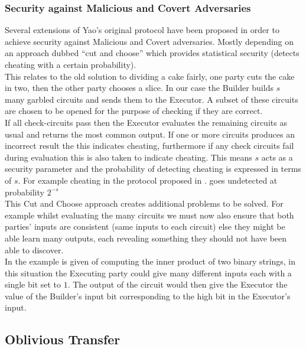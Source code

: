 \documentclass[a4paper,11pt]{article}
\begin{document}
			\subsubsection{Security against Malicious and Covert Adversaries}
				Several extensions of Yao's original protocol have been proposed in order to achieve security against Malicious and Covert adversaries. Mostly depending on an approach dubbed ``cut and choose'' which provides statistical security (detects cheating with a certain probability).\\

				This relates to the old solution to dividing a cake fairly, one party cuts the cake in two, then the other party chooses a slice. In our case the Builder builds $s$ many garbled circuits and sends them to the Executor. A subset of these circuits are chosen to be opened for the purpose of checking if they are correct.\\

				If all check-circuits pass then the Executor evaluates the remaining circuits as usual and returns the most common output. If one or more circuits produces an incorrect result the this indicates cheating, furthermore if any check circuits fail during evaluation this is also taken to indicate cheating. This means $s$ acts as a security parameter and the probability of detecting cheating is expressed in terms of $s$. For example cheating in the protocol proposed in \cite{Lindell_CnC_2013}. goes undetected at probability $2^{-s}$\\

				This Cut and Choose approach creates additional problems to be solved. For example whilst evaluating the many circuits we must now also ensure that both parties' inputs are consistent (same inputs to each circuit) else they might be able learn many outputs, each revealing something they should not have been able to discover.\\

				In \cite{LindellAndPinkas2007} the example is given of computing the inner product of two binary strings, in this situation the Executing party could give many different inputs each with a single bit set to $1$. The output of the circuit would then give the Executor the value of the Builder's input bit corresponding to the high bit in the Executor's input.\\


		\subsection{Oblivious Transfer} \label{OT_Intro}	
\end{document}
